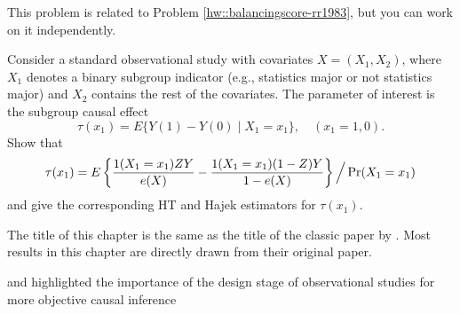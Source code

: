 \begin{HomeworkProblem}\label{exr:11-6}

This problem is related to Problem \ref{hw::balancingscore-rr1983}, but you can work on it independently.

Consider a standard observational study with covariates $X = (X_1, X_2)$, where $X_1$ denotes a binary subgroup indicator (e.g., statistics major or not statistics major) and $X_2$ contains the rest of the covariates. The parameter of interest is the subgroup causal effect
\[
\tau(x_1) = E\{ Y(1) - Y(0) \mid X_1 = x_1  \},\quad (x_1=1,0).
\]
Show that
\[
\tau(x_1) =  E\left\{   \frac{  1(X_1 = x_1) ZY}{ e(X) }   - \frac{  1(X_1 = x_1) (1-Z)Y}{ 1 -  e(X) }    \right\} \Big /  \operatorname{Pr}(X_1 = x_1)
\]
and give the corresponding HT and Hajek estimators for $\tau(x_1) $.



\end{HomeworkProblem}

\begin{HomeworkProblem}\label{exr:11-7}


The title of this chapter is the same as the title of the classic paper by \citet{rosenbaum1983central}. Most results in this chapter are directly drawn from their original paper.


\citet{rubin2007design} and \citet{rubin2008objective} highlighted the importance of the design stage of observational studies for more objective causal inference


\end{HomeworkProblem}
